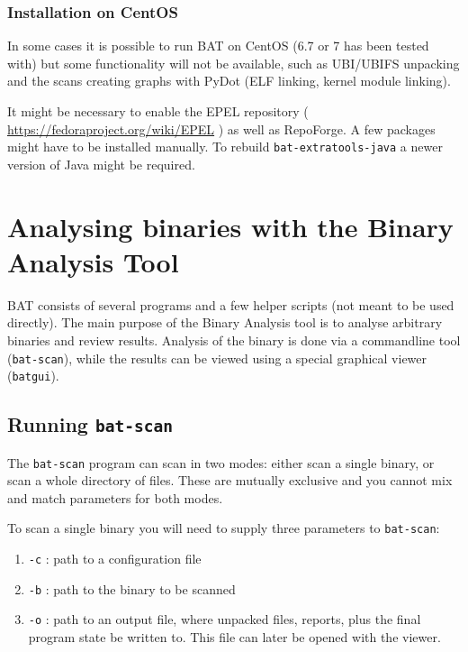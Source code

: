 \documentclass[10pt,a4paper]{article}
\begin{document}
\subsubsection{Installation on CentOS}

In some cases it is possible to run BAT on CentOS (6.7 or 7 has been tested
with) but some functionality will not be available, such as UBI/UBIFS
unpacking and the scans creating graphs with PyDot (ELF linking, kernel module
linking).

It might be necessary to enable the EPEL repository (
\url{https://fedoraproject.org/wiki/EPEL} ) as well as RepoForge. A few
packages might have to be installed manually. To rebuild
\texttt{bat-extratools-java} a newer version of Java might be required.

\section{Analysing binaries with the Binary Analysis Tool}

BAT consists of several programs and a few helper scripts (not meant to be
used directly). The main purpose of the Binary Analysis tool is to analyse
arbitrary binaries and review results. Analysis of the binary is done via
a commandline tool (\texttt{bat-scan}), while the results can be viewed using
a special graphical viewer (\texttt{batgui}).

\subsection{Running \texttt{bat-scan}}

The \texttt{bat-scan} program can scan in two modes: either scan a single
binary, or scan a whole directory of files. These are mutually exclusive and
you cannot mix and match parameters for both modes.

To scan a single binary you will need to supply three parameters to
\texttt{bat-scan}:

\begin{enumerate}
\item \texttt{-c} : path to a configuration file
\item \texttt{-b} : path to the binary to be scanned
\item \texttt{-o} : path to an output file, where unpacked files, reports,
plus the final program state be written to. This file can later be opened with
the viewer.
\end{enumerate}
\end{document}
